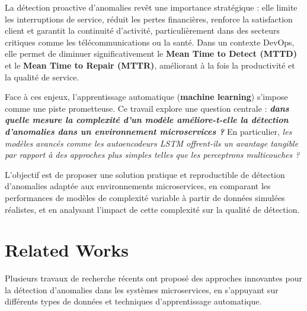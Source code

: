 \documentclass[conference]{IEEEtran}
\begin{document}
La détection proactive d’anomalies revêt une importance stratégique : elle limite les interruptions de service, réduit les pertes financières, renforce la satisfaction client et garantit la continuité d’activité, particulièrement dans des secteurs critiques comme les télécommunications ou la santé. Dans un contexte DevOps, elle permet de diminuer significativement le \cite{Morais2023_mttd_mttr} \textbf{Mean Time to Detect (MTTD)} et le \textbf{Mean Time to Repair (MTTR)}, améliorant à la fois la productivité et la qualité de service.

Face à ces enjeux, l’apprentissage automatique (\textbf{machine learning}) s’impose comme une piste prometteuse. Ce travail explore une question centrale : \textbf{\textit{dans quelle mesure la complexité d’un modèle améliore-t-elle la détection d’anomalies dans un environnement microservices ?}} En particulier, \textit{les modèles avancés comme les autoencodeurs LSTM offrent-ils un avantage tangible par rapport à des approches plus simples telles que les perceptrons multicouches ?}

L’objectif est de proposer une solution pratique et reproductible de détection d’anomalies adaptée aux environnements microservices, en comparant les performances de modèles de complexité variable à partir de données simulées réalistes, et en analysant l’impact de cette complexité sur la qualité de détection.

\section{Related Works}
Plusieurs travaux de recherche récents ont proposé des approches innovantes pour la détection d’anomalies dans les systèmes microservices, en s’appuyant sur différents types de données et techniques d’apprentissage automatique.
\end{document}
